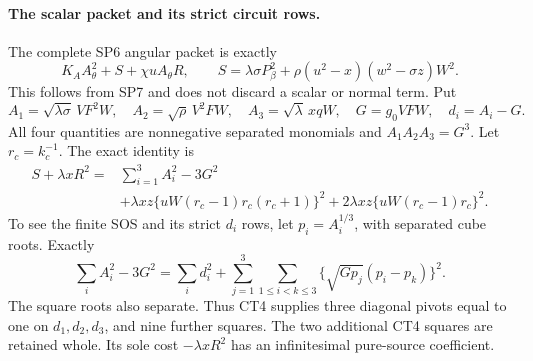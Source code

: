 \paragraph{The scalar packet and its strict circuit rows.}
The complete SP6 angular packet is exactly
\[
 K_A A_\theta^2+S+\chi uA_\theta R,
 \qquad S=\lambda\sigma P_\beta^2+
                    \rho(u^2-x)(w^2-\sigma z)W^2.              \tag{CT3}
\]
This follows from SP7 and does not discard a scalar or normal term.
Put
\[
 A_1=\sqrt{\lambda\sigma}\,VF^2W,\quad
 A_2=\sqrt\rho\,V^2FW,\quad
 A_3=\sqrt\lambda\,xqW,\quad
 G=g_0VFW,\quad d_i=A_i-G.
\]
All four quantities are nonnegative separated monomials and
$A_1A_2A_3=G^3$.  Let $r_c=k_c^{-1}$.  The exact identity is
\[
\begin{split}
 S+\lambda xR^2={}&\sum_{i=1}^3A_i^2-3G^2\\
 &+\lambda xz\{uW(r_c-1)r_c(r_c+1)\}^2
   +2\lambda xz\{uW(r_c-1)r_c\}^2.             \end{split} \tag{CT4}
\]
To see the finite SOS and its strict $d_i$ rows, let
$p_i=A_i^{1/3}$, with separated cube roots.  Exactly
\[
 \sum_iA_i^2-3G^2
 =\sum_i d_i^2+
   \sum_{j=1}^3\sum_{1\le i<k\le3}
       \{\sqrt{Gp_j}(p_i-p_k)\}^2.             \tag{CT5}
\]
The square roots also separate.  Thus CT4 supplies three diagonal
pivots equal to one on $d_1,d_2,d_3$, and nine further squares.
The two additional CT4 squares are retained whole.  Its sole cost
$-\lambda xR^2$ has an infinitesimal pure-source coefficient.

